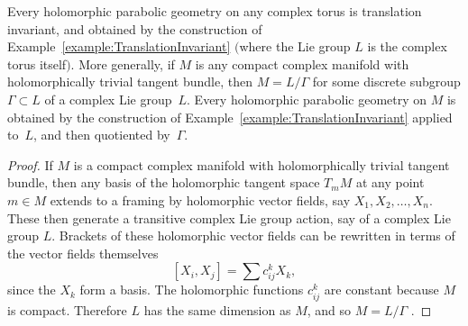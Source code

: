 \begin{theorem}\label{theorem:translation}
Every holomorphic parabolic geometry on any complex torus is translation
inva\-riant, and obtained by the construction of
Example~{\rm \ref{example:TranslationInvariant}}
$($where the Lie group $L$ is the complex torus itself$)$.
More generally, if $M$ is any compact complex
manifold with holomorphically trivial tangent bundle,
then $M=L/\Gamma$ for some discrete
subgroup $\Gamma \subset L$ of a complex
Lie group~$L$. Every holomorphic parabolic geometry
on $M$ is obtained by the construction of
Example~{\rm \ref{example:TranslationInvariant}}
applied to~$L$, and then quotiented by~$\Gamma$.
\end{theorem}

\begin{proof}
If $M$ is a compact complex manifold with holomorphically
trivial tangent bundle, then any basis of the
holomorphic tangent space $T_m M$ at any point $m \in M$
extends to a framing by holomorphic vector f\/ields, say $X_1, X_2, \dots, X_n$.
These then generate a transitive complex Lie group action,
say of a complex Lie group $L$. Brackets of these
holomorphic vector f\/ields can be rewritten in terms
of the vector f\/ields themselves
\[
\left[X_i,X_j\right]=\sum c^k_{ij} X_k,
\]
since the $X_k$ form a basis. The holomorphic functions
$c^k_{ij}$ are constant because $M$ is compact. Therefore $L$ has the same
dimension as $M$, and so $M = L/\Gamma$ \cite{Wang:1954}.


\end{proof}

